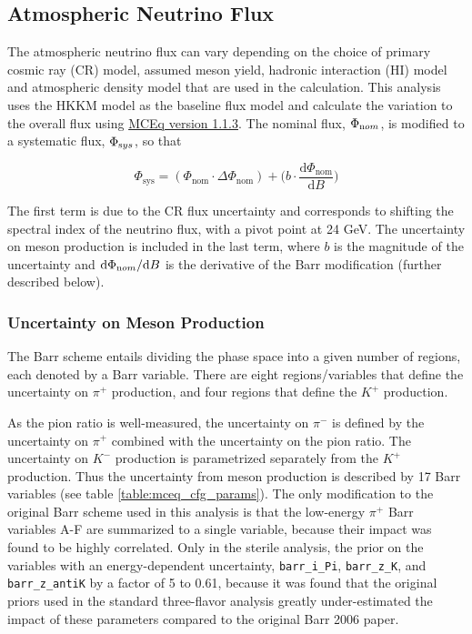 \subsection{Atmospheric Neutrino Flux}
\label{section:flux_systs}

The atmospheric neutrino flux can vary depending on the choice of primary cosmic ray (CR) model, assumed meson yield, hadronic interaction (HI) model and atmospheric density model that are used in the calculation. This analysis uses the HKKM model as the baseline flux model and calculate the variation to the overall flux using \href{https://github.com/afedynitch/MCEq}{MCEq version 1.1.3}. The nominal flux, $\Phi_{\rm nom}$, is modified to a systematic flux, $\Phi_{\rm sys}$, so that

$$\Phi_{\mathrm{sys}} = (\Phi_{\mathrm{nom}} \cdot \Delta \Phi_{\mathrm{nom}}) + \bigg( b \cdot \frac{\mathrm{d} \Phi_{\mathrm{nom}}}{\mathrm{d}B} \bigg)$$

The first term is due to the CR flux uncertainty and corresponds to shifting the spectral index of the neutrino flux, with a pivot point at 24 GeV. The uncertainty on meson production is included in the last term, where $b$ is the magnitude of the uncertainty and $ {\rm d} \Phi_{\rm nom} / {\rm d}B $ is the derivative of the Barr modification  (further described below). 

\subsubsection{Uncertainty on Meson Production}

The Barr scheme entails dividing the phase space into a given number of regions, each denoted by a Barr variable. There are eight regions/variables that define the uncertainty on $ \pi^+ $ production, and four regions that define the $K^+$ production. 

As the pion ratio is well-measured, the uncertainty on $ \pi^- $ is defined by the uncertainty on $ \pi^+ $ combined with the uncertainty on the pion ratio. The uncertainty on $ K^- $ production is parametrized separately from the $K^+$ production. Thus the uncertainty from meson production is described by 17 Barr variables (see table \ref{table:mceq_cfg_params}). 
The only modification to the original Barr scheme used in this analysis is that the low-energy $ \pi^+ $ Barr variables A-F are summarized to a single variable, because their impact was found to be highly correlated. Only in the sterile analysis, the prior on the variables with an energy-dependent uncertainty, \texttt{barr\_i\_Pi}, \texttt{barr\_z\_K}, and \texttt{barr\_z\_antiK} by a factor of 5 to 0.61, because it was found that the original priors used in the standard three-flavor analysis greatly under-estimated the impact of these parameters compared to the original Barr 2006 paper.

